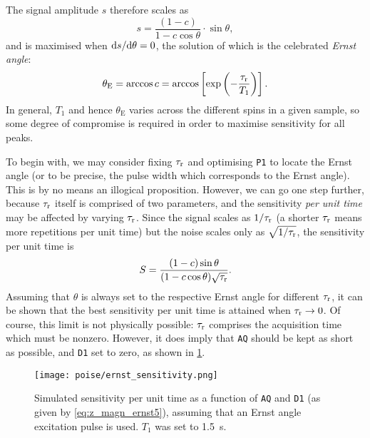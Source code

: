 The signal amplitude $s$ therefore scales as
\begin{equation}
    \label{eq:z_magn_ernst4}
    s = \frac{(1 - c)}{1 - c\cos\theta} \cdot \sin\theta,
\end{equation}
and is maximised when $\mathrm{d} s/\mathrm{d} \theta = 0$, the solution of which is the celebrated \textit{Ernst angle}\autocite{Ernst1966RSI}:
\begin{equation}
    \label{eq:ernst_angle}
    \theta_\text{E} = \arccos{c} = \arccos\left[\exp\left(-\frac{\tau_\mathrm{r}}{T_1}\right)\right].
\end{equation}
In general, $T_1$ and hence $\theta_\text{E}$ varies across the different spins in a given sample, so some degree of compromise is required in order to maximise sensitivity for all peaks.

To begin with, we may consider fixing $\tau_\mathrm{r}$ and optimising \texttt{P1} to locate the Ernst angle (or to be precise, the pulse width which corresponds to the Ernst angle).
This is by no means an illogical proposition.
However, we can go one step further, because $\tau_\mathrm{r}$ itself is comprised of two parameters, and the sensitivity \textit{per unit time} may be affected by varying $\tau_\mathrm{r}$.
Since the signal scales as $1/\tau_\mathrm{r}$ (a shorter $\tau_\mathrm{r}$ means more repetitions per unit time) but the noise scales only as $\sqrt{1/\tau_\mathrm{r}}$, the sensitivity per unit time is
\begin{equation}
    \label{eq:z_magn_ernst5}
    S = \frac{(1 - c)\sin\theta}{(1 - c\cos\theta)\sqrt{\tau_\mathrm{r}}}.
\end{equation}
Assuming that $\theta$ is always set to the respective Ernst angle for different $\tau_\mathrm{r}$, it can be shown that the best sensitivity per unit time is attained when $\tau_\mathrm{r} \to 0$.\autocite{Waugh1970JMS,Traficante1992CMR}
Of course, this limit is not physically possible: $\tau_\mathrm{r}$ comprises the acquisition time which must be nonzero.
However, it does imply that \texttt{AQ} should be kept as short as possible, and \texttt{D1} set to zero, as shown in \cref{fig:ernst_sensitivity}.

\begin{figure}[htb]
    \centering
    \texttt{[image: poise/ernst\_sensitivity.png]}%
    \caption[Sensitivity per unit time as a function of \texttt{AQ} and \texttt{D1}]{Simulated sensitivity per unit time as a function of \texttt{AQ} and \texttt{D1} (as given by \cref{eq:z_magn_ernst5}), assuming that an Ernst angle excitation pulse is used. $T_1$ was set to \qty{1.5}{\s}.}
    \label{fig:ernst_sensitivity}
\end{figure}


